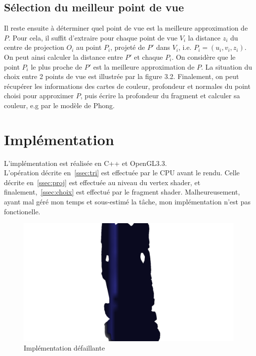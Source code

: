 \subsection{Sélection du meilleur point de vue}
Il reste ensuite à déterminer quel point de vue est la meilleure approximation de $P$. Pour cela, il suffit d'extraire pour chaque point de vue $V_i$ la
distance $z_i$ du centre de projection $O_i$ au point $P_i$, projeté de $P'$ dans $V_i$, i.e. $P_i=(u_i, v_i, z_i)$. On peut ainsi calculer la distance entre $P'$
et chaque $P_i$. On considère que le point $P_i$ le plus proche de $P'$ est la meilleure approximation de $P$. La situation du choix entre 2 points de vue est
illustrée par la figure 3.2. Finalement, on peut récupérer les informations des cartes de couleur, profondeur et normales du point choisi pour approximer $P$,
puis écrire la profondeur du fragment et calculer sa couleur, e.g par le modèle de Phong.

\section{Implémentation}
L'implémentation est réalisée en C++ et OpenGL3.3.\\
L'opération décrite en~\ref{ssec:tri} est effectuée par le CPU avant le rendu. Celle décrite en~\ref{ssec:proj} est effectuée au niveau du vertex shader,
et finalement,~\ref{ssec:choix} est effectué par le fragment shader.
Malheureusement, ayant mal géré mon temps et sous-estimé la t\^ache, mon implémentation n'est pas fonctionelle.

\begin{figure}\label{fig:fail}
    \centering
    \caption{Implémentation défaillante}
    \includegraphics[scale=0.4]{images/fail_transparent.png}
\end{figure}

